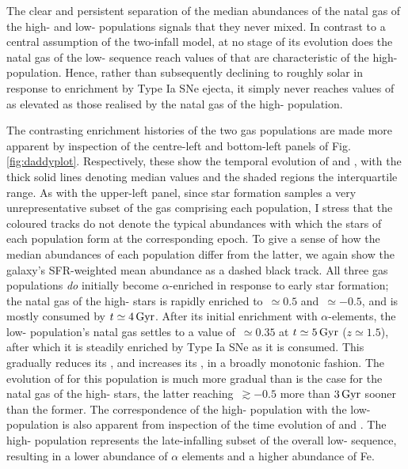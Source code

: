 The clear and persistent separation of the median abundances of the natal gas of the high- and low-\afe{} populations signals that they never mixed. In contrast to a central assumption of the two-infall model, at no stage of its evolution does the natal gas of the low-\afe{} sequence reach values of \afe{} that are characteristic of the high-\afe{} population. Hence, rather than subsequently declining to roughly solar \afe{} in response to enrichment by Type Ia SNe ejecta, it simply never reaches values of \afe{} as elevated as those realised by the natal gas of the high-\afe{} population. 

The contrasting enrichment histories of the two gas populations are made more apparent by inspection of the centre-left and bottom-left panels of Fig. \ref{fig:daddyplot}. Respectively, these show the temporal evolution of \afe{} and \feh{}, with the thick solid lines denoting median values and the shaded regions the interquartile range. As with the upper-left panel, since star formation samples a very unrepresentative subset of the gas comprising each population, I stress that the coloured tracks do not denote the typical abundances with which the stars of each population form at the corresponding epoch. To give a sense of how the median abundances of each population differ from the latter, we again show the galaxy's SFR-weighted mean abundance as a dashed black track. All three gas populations \emph{do} initially become $\alpha$-enriched in response to early star formation; the natal gas of the high-\afe{} stars is rapidly enriched to \afe{}$\,\simeq 0.5$ and \feh{}$\,\simeq -0.5$, and is mostly consumed by $t\simeq 4\,{\rm Gyr}$. After its initial enrichment with $\alpha$-elements, the low-\afe{} population's natal gas settles to a value of \afe{}$\,\simeq 0.35$ at $t\simeq 5\,{\rm Gyr}$ ($z \simeq 1.5$), after which it is steadily enriched by Type Ia SNe as it is consumed. This gradually reduces its \afe{}, and increases its \feh{}, in a broadly monotonic fashion. The evolution of \feh{} for this population is much more gradual than is the case for the natal gas of the high-\afe{} stars, the latter reaching \feh{}$\,\gtrsim -0.5$ more than $3\,{\rm Gyr}$ sooner than the former. The correspondence of the high-\feh{} population with the low-\afe{} population is also apparent from inspection of the time evolution of \afe{} and \feh{}. The high-\feh{} population represents the late-infalling subset of the overall low-\afe{} sequence, resulting in a lower abundance of $\alpha$ elements and a higher abundance of Fe. 

